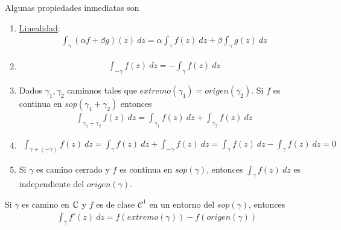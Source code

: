 \begin{obs}
    Algunas propiedades inmediatas son
    \begin{enumerate}
        \item \underline{Linealidad}:
              \begin{align*}
                  \int_{\gamma}{(\alpha f + \beta g)(z) \ dz} = \alpha\int_{\gamma}{f(z) \ dz} + \beta\int_{\gamma}{g(z) \ dz}
              \end{align*}
        \item
              \begin{align*}
                  \int_{-\gamma}{f(z) \ dz} = -\int_{\gamma}{f(z) \ dz}
              \end{align*}
        \item Dados $\gamma_1,\gamma_2$ caminnos tales que $extremo(\gamma_1) = origen(\gamma_2)$. Si $f$ es continua en $sop(\gamma_1 + \gamma_2)$ entonces
              \begin{align*}
                  \int_{\gamma_1 + \gamma_2}{f(z) \ dz} = \int_{\gamma_1}{f(z) \ dz} + \int_{\gamma_2}{f(z) \ dz}
              \end{align*}
        \item
              \begin{align*}
                  \int_{\gamma + (-\gamma)}{f(z) \ dz} = \int_{\gamma}{f(z) \ dz} + \int_{-\gamma}{f(z) \ dz} = \int_{\gamma}{f(z) \ dz} - \int_{\gamma}{f(z) \ dz} = 0
              \end{align*}
        \item Si $\gamma$ es camino cerrado  y $f$ es continua en $sop(\gamma)$, entonces $\int_{\gamma}{f(z) \ dz}$ es independiente del $origen(\gamma)$.
    \end{enumerate}
\end{obs}

\begin{prop}
    Si $\gamma$ es camino en $\mathbb{C}$ y $f$ es de clase $\mathcal{C}^1$ en un entorno del $sop(\gamma)$, entonces
    \begin{align*}
        \int_{\gamma}{f'(z) \ dz} = f(extremo(\gamma)) - f(origen(\gamma))
    \end{align*}
\end{prop}

